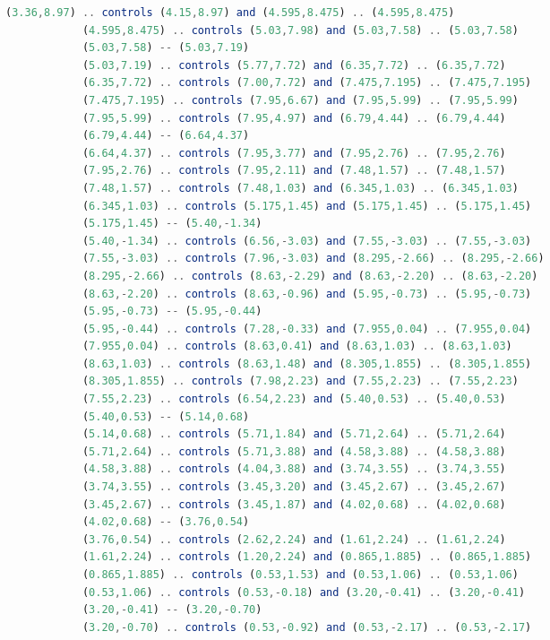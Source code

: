 \documentclass[11pt]{article}
\begin{document}
\begin{multicols}{3}
\begin{lstlisting}[language=JavaScript,caption={The buggy tikz code towards a Michelin star \emoji{-1}},captionpos=b, label={lst:michelinmodel}]
            (3.36,8.97) .. controls (4.15,8.97) and (4.595,8.475) .. (4.595,8.475)
            (4.595,8.475) .. controls (5.03,7.98) and (5.03,7.58) .. (5.03,7.58)
            (5.03,7.58) -- (5.03,7.19)
            (5.03,7.19) .. controls (5.77,7.72) and (6.35,7.72) .. (6.35,7.72)
            (6.35,7.72) .. controls (7.00,7.72) and (7.475,7.195) .. (7.475,7.195)
            (7.475,7.195) .. controls (7.95,6.67) and (7.95,5.99) .. (7.95,5.99)
            (7.95,5.99) .. controls (7.95,4.97) and (6.79,4.44) .. (6.79,4.44)
            (6.79,4.44) -- (6.64,4.37)
            (6.64,4.37) .. controls (7.95,3.77) and (7.95,2.76) .. (7.95,2.76)
            (7.95,2.76) .. controls (7.95,2.11) and (7.48,1.57) .. (7.48,1.57)
            (7.48,1.57) .. controls (7.48,1.03) and (6.345,1.03) .. (6.345,1.03)
            (6.345,1.03) .. controls (5.175,1.45) and (5.175,1.45) .. (5.175,1.45)
            (5.175,1.45) -- (5.40,-1.34)
            (5.40,-1.34) .. controls (6.56,-3.03) and (7.55,-3.03) .. (7.55,-3.03)
            (7.55,-3.03) .. controls (7.96,-3.03) and (8.295,-2.66) .. (8.295,-2.66)
            (8.295,-2.66) .. controls (8.63,-2.29) and (8.63,-2.20) .. (8.63,-2.20)
            (8.63,-2.20) .. controls (8.63,-0.96) and (5.95,-0.73) .. (5.95,-0.73)
            (5.95,-0.73) -- (5.95,-0.44)
            (5.95,-0.44) .. controls (7.28,-0.33) and (7.955,0.04) .. (7.955,0.04)
            (7.955,0.04) .. controls (8.63,0.41) and (8.63,1.03) .. (8.63,1.03)
            (8.63,1.03) .. controls (8.63,1.48) and (8.305,1.855) .. (8.305,1.855)
            (8.305,1.855) .. controls (7.98,2.23) and (7.55,2.23) .. (7.55,2.23)
            (7.55,2.23) .. controls (6.54,2.23) and (5.40,0.53) .. (5.40,0.53)
            (5.40,0.53) -- (5.14,0.68)
            (5.14,0.68) .. controls (5.71,1.84) and (5.71,2.64) .. (5.71,2.64)
            (5.71,2.64) .. controls (5.71,3.88) and (4.58,3.88) .. (4.58,3.88)
            (4.58,3.88) .. controls (4.04,3.88) and (3.74,3.55) .. (3.74,3.55)
            (3.74,3.55) .. controls (3.45,3.20) and (3.45,2.67) .. (3.45,2.67)
            (3.45,2.67) .. controls (3.45,1.87) and (4.02,0.68) .. (4.02,0.68)
            (4.02,0.68) -- (3.76,0.54)
            (3.76,0.54) .. controls (2.62,2.24) and (1.61,2.24) .. (1.61,2.24)
            (1.61,2.24) .. controls (1.20,2.24) and (0.865,1.885) .. (0.865,1.885)
            (0.865,1.885) .. controls (0.53,1.53) and (0.53,1.06) .. (0.53,1.06)
            (0.53,1.06) .. controls (0.53,-0.18) and (3.20,-0.41) .. (3.20,-0.41)
            (3.20,-0.41) -- (3.20,-0.70)
            (3.20,-0.70) .. controls (0.53,-0.92) and (0.53,-2.17) .. (0.53,-2.17)

\end{lstlisting}
\end{multicols}
\end{document}
